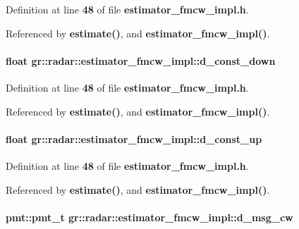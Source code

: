 Definition at line {\bf 48} of file {\bf estimator\+\_\+fmcw\+\_\+impl.\+h}.



Referenced by {\bf estimate()}, and {\bf estimator\+\_\+fmcw\+\_\+impl()}.

\paragraph[{d\+\_\+const\+\_\+down}]{\setlength{\rightskip}{0pt plus 5cm}float gr\+::radar\+::estimator\+\_\+fmcw\+\_\+impl\+::d\+\_\+const\+\_\+down}\label{classgr_1_1radar_1_1estimator__fmcw__impl_a119186c1c651ff33c1a8d2e7488d3257}


Definition at line {\bf 48} of file {\bf estimator\+\_\+fmcw\+\_\+impl.\+h}.



Referenced by {\bf estimate()}, and {\bf estimator\+\_\+fmcw\+\_\+impl()}.

\paragraph[{d\+\_\+const\+\_\+up}]{\setlength{\rightskip}{0pt plus 5cm}float gr\+::radar\+::estimator\+\_\+fmcw\+\_\+impl\+::d\+\_\+const\+\_\+up}\label{classgr_1_1radar_1_1estimator__fmcw__impl_a9839874e5b204f71b58e57e849ff5b3a}


Definition at line {\bf 48} of file {\bf estimator\+\_\+fmcw\+\_\+impl.\+h}.



Referenced by {\bf estimate()}, and {\bf estimator\+\_\+fmcw\+\_\+impl()}.

\paragraph[{d\+\_\+msg\+\_\+cw}]{\setlength{\rightskip}{0pt plus 5cm}pmt\+::pmt\+\_\+t gr\+::radar\+::estimator\+\_\+fmcw\+\_\+impl\+::d\+\_\+msg\+\_\+cw}\label{classgr_1_1radar_1_1estimator__fmcw__impl_a423a3412b57bf9c85b33f4ace4fa5fbb}


